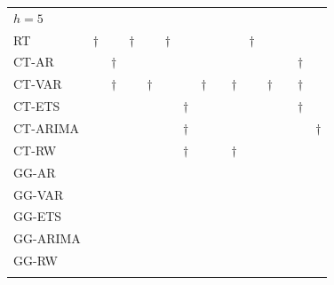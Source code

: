 \documentclass[12pt,a4paper]{article}
\begin{document}
\begin{table}[!htbp]
\begin{centering}
\begin{tabular}{@{}lcccccccccccccc@{}}
                   {$h=5$}      &   &   &   &   &   &   &   &  &   &   &   &  &   &    \\
RT       & $\dagger$ &   & $\dagger$ &   & $\dagger$ &   &   &  &   & $\dagger$ &   &  &   &    \\
CT-AR    &   & $\dagger$ &   &   &   &   &   &  &   &   &   &  & $\dagger$ &    \\
CT-VAR   &   & $\dagger$ &   & $\dagger$ &   &   & $\dagger$ &  & $\dagger$ &   & $\dagger$ &  & $\dagger$ &    \\
CT-ETS   &   &   &   &   &   & $\dagger$ &   &  &   &   &   &  & $\dagger$ &    \\
CT-ARIMA &   &   &   &   &   & $\dagger$ &   &  &   &   &   &  &   & $\dagger$  \\
CT-RW    &   &   &   &   &   & $\dagger$ &   &  & $\dagger$ &   &   &  &   &    \\
GG-AR    &   &   &   &   &   &   &   &  &   &   &   &  &   &    \\
GG-VAR   &   &   &   &   &   &   &   &  &   &   &   &  &   &    \\
GG-ETS   &   &   &   &   &   &   &   &  &   &   &   &  &   &    \\
GG-ARIMA &   &   &   &   &   &   &   &  &   &   &   &  &   &    \\
GG-RW    &   &   &   &   &   &   &   &  &   &   &   &  &   & \\
                   &            &            &            &            &            &             &            &  &             &            &            &                      &                      &                       \\


\end{tabular}
\end{centering}
\end{table}
\end{document}
